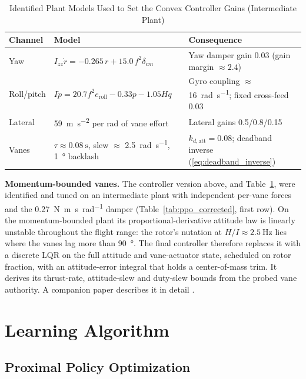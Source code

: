 \documentclass[conference]{IEEEtran}
\begin{document}
\begin{table}[htbp]
\caption{Identified Plant Models Used to Set the Convex Controller Gains (Intermediate Plant)}
\label{tab:sysid}
\centering
\footnotesize
\setlength{\tabcolsep}{3pt}
\begin{tabular}{>{\raggedright\arraybackslash}p{}>{\raggedright\arraybackslash}p{}>{\raggedright\arraybackslash}p{}}
\toprule
\textbf{Channel} & \textbf{Model} & \textbf{Consequence} \\
\midrule
Yaw & $I_{zz}\dot r = -0.265\,r + 15.0\,f^2\delta_{cm}$ & Yaw damper gain 0.03 (gain margin $\approx 2.4$) \\
Roll/pitch & $I\dot p = 20.7 f^2 e_{\text{roll}} - 0.33p - 1.05 H q$ & Gyro coupling $\approx$ \SI{16}{\radian\per\second}; fixed cross-feed 0.03 \\
Lateral & \SI{59}{\metre\per\second\squared} per rad of vane effort & Lateral gains 0.5/0.8/0.15 \\
Vanes & $\tau \approx \SI{0.08}{\second}$, slew $\approx$ \SI{2.5}{\radian\per\second}, \SI{1}{\degree} backlash & $k_{d,\text{att}} = 0.08$; deadband inverse (\ref{eq:deadband_inverse}) \\
\bottomrule
\end{tabular}
\end{table}


\textbf{Momentum-bounded vanes.} The controller version above, and Table~\ref{tab:sysid}, were identified and tuned on an intermediate plant with independent per-vane forces and the \SI{0.27}{\newton\metre\second\per\radian} damper (Table~\ref{tab:ppo_corrected}, first row). On the momentum-bounded plant its proportional-derivative attitude law is linearly unstable throughout the flight range: the rotor's nutation at $H/I \approx \SI{2.5}{\hertz}$ lies where the vanes lag more than \SI{90}{\degree}. The final controller therefore replaces it with a discrete LQR on the full attitude and vane-actuator state, scheduled on rotor fraction, with an attitude-error integral that holds a center-of-mass trim. It derives its thrust-rate, attitude-slew and duty-slew bounds from the probed vane authority. A companion paper describes it in detail \cite{b28}.

\section{Learning Algorithm}

\subsection{Proximal Policy Optimization}
\end{document}
